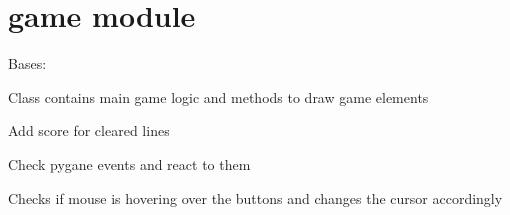 \documentclass[letterpaper,10pt,english]{sphinxmanual}
\begin{document}
\sphinxstepscope


\chapter{game module}
\label{\detokenize{game:module-game}}\label{\detokenize{game:game-module}}\label{\detokenize{game::doc}}

\begin{fulllineitems}
\label{\detokenize{game:game.Game}}
\pysigstartsignatures
{}
\pysigstopsignatures
\sphinxAtStartPar
Bases: 

\sphinxAtStartPar
Class contains main game logic and methods to draw game elements

\begin{fulllineitems}
\label{\detokenize{game:game.Game.add_score}}
\pysigstartsignatures
{}
\pysigstopsignatures
\sphinxAtStartPar
Add score for cleared lines

\end{fulllineitems}


\begin{fulllineitems}
\label{\detokenize{game:game.Game.check_events}}
\pysigstartsignatures
{}
\pysigstopsignatures
\sphinxAtStartPar
Check pygane events and react to them

\end{fulllineitems}


\begin{fulllineitems}
\label{\detokenize{game:game.Game.check_hover}}
\pysigstartsignatures
{}
\pysigstopsignatures
\sphinxAtStartPar
Checks if mouse is hovering over the buttons and changes the cursor accordingly


\end{fulllineitems}
\end{fulllineitems}
\end{document}
